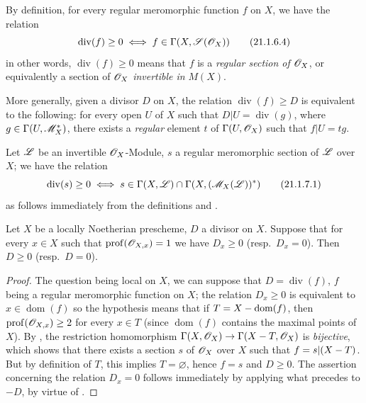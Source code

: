 By definition, for every regular meromorphic function $f$ on $X$, we have the relation
\[
\label{IV.21.1.6.4}
  \operatorname{div}(f)\geq 0 \iff f\in\Gamma(X,\mathscr{S}(\mathscr{O}_X))
  \tag{21.1.6.4}
\]
in other words, $\operatorname{div}(f)\geq 0$ means that $f$ is a \emph{regular section of} $\mathscr{O}_X$, or equivalently a section of $\mathscr{O}_X$ \emph{invertible in} $M(X)$.

More generally, given a divisor $D$ on $X$, the relation $\operatorname{div}(f)\geq D$ is equivalent to the following: for every open $U$ of $X$ such that $D|U=\operatorname{div}(g)$, where $g\in\Gamma(U,\mathscr{M}_X^*)$, there exists a \emph{regular} element $t$ of $\Gamma(U,\mathscr{O}_X)$ such that $f|U=tg$.

\begin{env}[21.1.7]
\label{IV.21.1.7}
Let $\mathscr{L}$ be an invertible $\mathscr{O}_X$-Module, $s$ a regular meromorphic section of $\mathscr{L}$ over $X$;
we have the relation
\[
\label{IV.21.1.7.1}
  \operatorname{div}(s)\geq 0 \iff s\in\Gamma(X,\mathscr{L})\cap\Gamma(X,(\mathscr{M}_X(\mathscr{L}))^*)
  \tag{21.1.7.1}
\]
as follows immediately from the definitions  and .
\end{env}

\begin{proposition}[21.1.8]
\label{IV.21.1.8}
Let $X$ be a locally Noetherian prescheme, $D$ a divisor on $X$.
Suppose that for every $x\in X$ such that $\operatorname{prof}(\mathscr{O}_{X,x})=1$ we have $D_x\geq 0$ \textup{(resp.\ $D_x=0$)}.
Then $D\geq 0$ \textup{(resp.\ $D=0$)}.
\end{proposition}

\begin{proof}
The question being local on $X$, we can suppose that $D=\operatorname{div}(f)$, $f$ being a
regular meromorphic function on $X$;
the relation $D_x\geq 0$ is equivalent to $x\in\operatorname{dom}(f)$ so the hypothesis means that if $T=X-\operatorname{dom}(f)$, then $\operatorname{prof}(\mathscr{O}_{X,x})\geq 2$ for every $x\in T$ (since $\operatorname{dom}(f)$ contains the maximal points of $X$).
By , the restriction homomorphism $\Gamma(X,\mathscr{O}_X)\to\Gamma(X- T,\mathscr{O}_X)$ is \emph{bijective}, which shows that there exists a section $s$ of $\mathscr{O}_X$ over $X$ such that $f=s|(X- T)$.
But by definition of $T$, this implies $T=\varnothing$, hence $f=s$ and $D\geq 0$.
The assertion concerning the relation $D_x=0$ follows immediately by applying what precedes to $-D$, by virtue of .
\end{proof}

